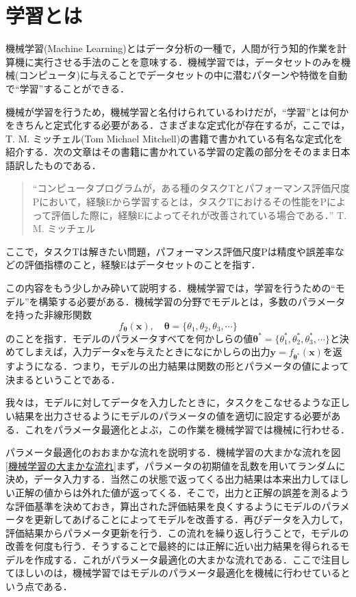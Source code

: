 \documentclass[a4paper,11pt]{jsreport}
\begin{document}
\section{学習とは}
機械学習(Machine Learning)とはデータ分析の一種で，人間が行う知的作業を計算機に実行させる手法のことを意味する．機械学習では，データセットのみを機械(コンピュータ)に与えることでデータセットの中に潜むパターンや特徴を自動で``学習''することができる．\par
機械が学習を行うため，機械学習と名付けられているわけだが，``学習''とは何かをきちんと定式化する必要がある．さまざまな定式化が存在するが，ここでは，T. M. ミッチェル(Tom Michael Mitchell)の書籍\cite{Tom1997Machine}で書かれている有名な定式化を紹介する．次の文章はその書籍に書かれている学習の定義の部分をそのまま日本語訳したものである．
\begin{quote}
  ``コンピュータプログラムが，ある種のタスクTとパフォーマンス評価尺度Pにおいて，経験Eから学習するとは，タスクTにおけるその性能をPによって評価した際に，経験Eによってそれが改善されている場合である．''
  \hfill T. M. ミッチェル
\end{quote}
ここで，タスクTは解きたい問題，パフォーマンス評価尺度Pは精度や誤差率などの評価指標のこと，経験Eはデータセットのことを指す．\par
この内容をもう少しかみ砕いて説明する．機械学習では，学習を行うための``モデル''を構築する必要がある．機械学習の分野でモデルとは，多数のパラメータを持った非線形関数
\begin{equation}
  f_{\bm{\theta}}(\bm{x}), \quad \bm{\theta} = \{ \theta_1, \theta_2, \theta_3, \cdots \}
\end{equation}
のことを指す．モデルのパラメータすべてを何かしらの値$\bm{\theta}^* = \{ \theta_1^*, \theta_2^*, \theta_3^*, \cdots \}$と決めてしまえば，入力データ$\bm{x}$を与えたときになにかしらの出力$\bm{y}=f_{\bm{\theta}^*}(\bm{x})$を返すようになる．つまり，モデルの出力結果は関数の形とパラメータの値によって決まるということである．\par
我々は，モデルに対してデータを入力したときに，タスクをこなせるような正しい結果を出力させるようにモデルのパラメータの値を適切に設定する必要がある．これをパラメータ最適化とよぶ，この作業を機械学習では機械に行わせる．\par
パラメータ最適化のおおまかな流れを説明する．機械学習の大まかな流れを図\ref{機械学習の大まかな流れ}まず，パラメータの初期値を乱数を用いてランダムに決め，データ入力する．当然この状態で返ってくる出力結果は本来出力してほしい正解の値からは外れた値が返ってくる．そこで，出力と正解の誤差を測るような評価基準を決めておき，算出された評価結果を良くするようにモデルのパラメータを更新してあげることによってモデルを改善する．再びデータを入力して，評価結果からパラメータ更新を行う．この流れを繰り返し行うことで，モデルの改善を何度も行う．そうすることで最終的には正解に近い出力結果を得られるモデルを作成する．これがパラメータ最適化の大まかな流れである．ここで注目してほしいのは，機械学習ではモデルのパラメータ最適化を機械に行わせているという点である．\par
\end{document}
